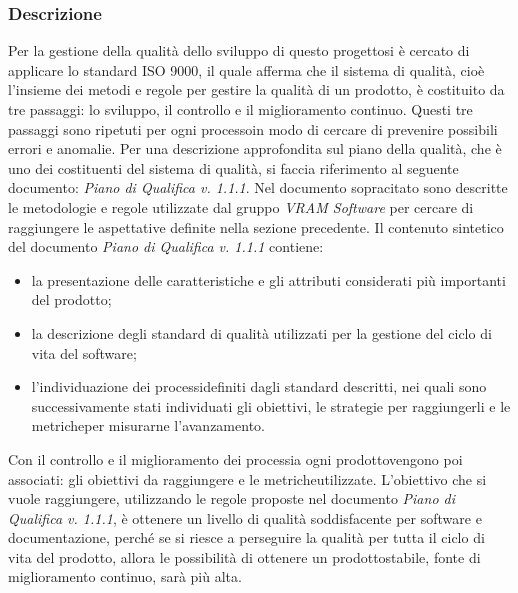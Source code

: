 \subsubsection{Descrizione}
Per la gestione della qualità dello sviluppo di questo progetto\glosp si è cercato di applicare lo standard ISO 9000, il quale afferma che il sistema di qualità, cioè l'insieme dei metodi e regole per gestire la qualità di un prodotto\glo, è costituito da tre passaggi: lo sviluppo, il controllo e il miglioramento continuo. Questi tre passaggi sono ripetuti per ogni processo\glosp in modo di cercare di prevenire possibili errori e anomalie.
Per una descrizione approfondita sul piano della qualità, che è uno dei costituenti del sistema di qualità, si faccia riferimento al seguente documento: \textit{Piano di Qualifica v. 1.1.1}.
Nel documento sopracitato sono descritte le metodologie e regole utilizzate dal gruppo \textit{VRAM Software} per cercare di raggiungere le aspettative definite nella sezione precedente.
Il contenuto sintetico del documento \textit{Piano di Qualifica v. 1.1.1} contiene:
\begin{itemize}
	\item la presentazione delle caratteristiche e gli attributi considerati più importanti del prodotto\glo;
	\item la descrizione degli standard di qualità utilizzati per la gestione del ciclo di vita del software;
	\item l'individuazione dei processi\glosp definiti dagli standard descritti, nei quali sono successivamente stati individuati gli obiettivi, le strategie per raggiungerli e le metriche\glosp per misurarne l'avanzamento.
\end{itemize}
Con il controllo e il miglioramento dei processi\glosp a ogni prodotto\glosp vengono poi associati: gli obiettivi da raggiungere e le metriche\glosp utilizzate.
L'obiettivo che si vuole raggiungere, utilizzando le regole proposte nel documento \textit{Piano di Qualifica v. 1.1.1}, è ottenere un livello di qualità soddisfacente per software e documentazione, perché se si riesce a perseguire la qualità per tutta il ciclo di vita del prodotto\glo, allora le possibilità di ottenere un prodotto\glosp stabile, fonte di miglioramento continuo, sarà più alta.
